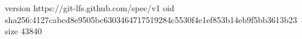 version https://git-lfs.github.com/spec/v1
oid sha256:4127cabcd8e9505bc6303464717519284c5530f4e1ef853b14eb9f5bb3613b23
size 43840
